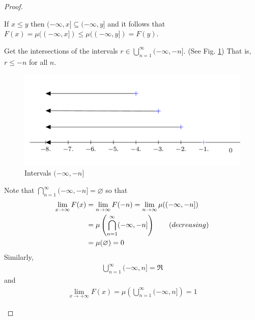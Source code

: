 \begin{proof}
\begin{prooflist}
\item If $x\leq y$ then $(-\infty, x]\subseteq (-\infty, y]$ and it follows that $F(x)=\mu((-\infty,x])\leq \mu((-\infty, y])=F(y)$.
\item Get the intersections of the intervals $r\in \bigcup\limits_{n=1}^{\infty}(-\infty,-n]$. (See Fig. \ref{fig:prob:2}) That is, $r\leq -n$ for all $n$.

\begin{figure}[h]
\caption{\label{fig:prob:2} Intervals $(-\infty,-n]$}
\centering
\includegraphics[width=0.75\linewidth]{overlap-intervals.png}
\end{figure}
Note that $\bigcap\limits_{n=1}^\infty (-\infty, -n]=\varnothing$ so that
\begin{align*}
\lim_{x\to\-\infty}F(x)&=\lim_{n\to\infty}F(-n)=\lim_{n\to\infty}\mu((-\infty,-n])\\
	&=\mu\left(\bigcap_{n=1}^\infty(-\infty,-n]\right)\qquad (decreasing)\\
	&=\mu(\varnothing)=0
\end{align*}
Similarly,
\begin{align*}
\bigcup_{n=1}^\infty (-\infty,n]=\Re
\end{align*}
and
\begin{align*}
\lim\limits_{x\to+\infty}F(x)=\mu\left(\bigcup_{n=1}^\infty (-\infty,n]\right)=1
\end{align*}



\end{prooflist}
\end{proof}

